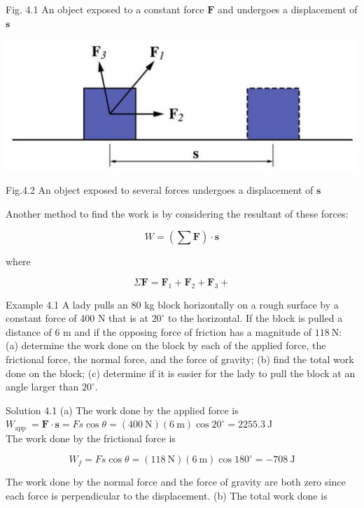 \documentclass[10pt]{article}
\begin{document}
Fig. 4.1 An object exposed to a constant force $\mathbf{F}$ and undergoes a displacement of $\mathbf{s}$

\begin{center}
\includegraphics[max width=\textwidth]{2024_09_13_db1f357d2aad0a03eb2eg-063}
\end{center}

Fig.4.2 An object exposed to several forces undergoes a displacement of $\mathbf{s}$

Another method to find the work is by considering the resultant of these forces:

$$
W=\left(\sum \mathbf{F}\right) \cdot \mathbf{s}
$$

where

$$
\Sigma \mathbf{F}=\mathbf{F}_{1}+\mathbf{F}_{2}+\mathbf{F}_{3}+
$$

Example 4.1 A lady pulls an 80 kg block horizontally on a rough surface by a constant force of 400 N that is at $20^{\circ}$ to the horizontal. If the block is pulled a distance of 6 m and if the opposing force of friction has a magnitude of $118 \mathrm{~N}:$ (a) determine the work done on the block by each of the applied force, the frictional force, the normal force, and the force of gravity; (b) find the total work done on the block; (c) determine if it is easier for the lady to pull the block at an angle larger than $20^{\circ}$.

Solution 4.1 (a) The work done by the applied force is\\
$W_{\text {app }}=\mathbf{F} \cdot \mathbf{s}=F s \cos \theta=(400 \mathrm{~N})(6 \mathrm{~m}) \cos 20^{\circ}=2255.3 \mathrm{~J}$\\
The work done by the frictional force is

$$
W_{f}=F s \cos \theta=(118 \mathrm{~N})(6 \mathrm{~m}) \cos 180^{\circ}=-708 \mathrm{~J}
$$

The work done by the normal force and the force of gravity are both zero since each force is perpendicular to the displacement. (b) The total work done is
\end{document}
